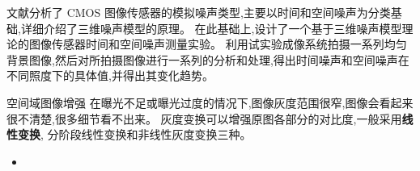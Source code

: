 \message{ !name(main.tex)}\documentclass{amsart}
\begin{document}
文献\cite{和文娟}分析了 CMOS 图像传感器的模拟噪声类型,主要以时间和空间噪声为分类基础,详细介绍了三维噪声模型的原理。
在此基础上,设计了一个基于三维噪声模型理论的图像传感器时间和空间噪声测量实验。
利用试实验成像系统拍摄一系列均匀背景图像,然后对所拍摄图像进行一系列的分析和处理,得出时间噪声和空间噪声在不同照度下的具体值,并得出其变化趋势。


空间域图像增强
在曝光不足或曝光过度的情况下,图像灰度范围很窄,图像会看起来很不清楚,很多细节看不出来。
灰度变换可以增强原图各部分的对比度,一般采用\textbf{线性变换},
分阶段线性变换和非线性灰度变换三种。
\begin{itemize}
\item
\end{itemize}

\end{document}
